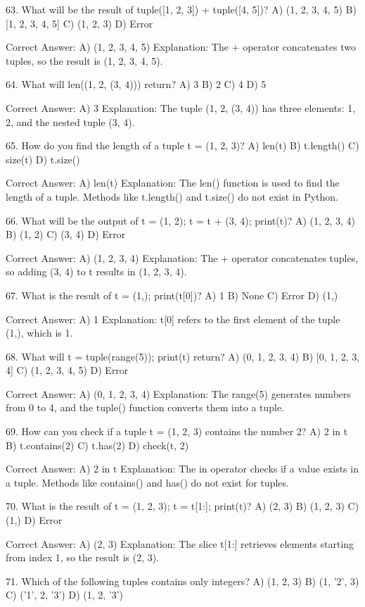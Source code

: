 63. What will be the result of tuple([1, 2, 3]) + tuple([4, 5])?
A) (1, 2, 3, 4, 5)
B) [1, 2, 3, 4, 5]
C) (1, 2, 3)
D) Error

Correct Answer: A) (1, 2, 3, 4, 5)
Explanation: The + operator concatenates two tuples, so the result is (1, 2, 3, 4, 5).

64. What will len((1, 2, (3, 4))) return?
A) 3
B) 2
C) 4
D) 5

Correct Answer: A) 3
Explanation: The tuple (1, 2, (3, 4)) has three elements: 1, 2, and the nested tuple (3, 4).

65. How do you find the length of a tuple t = (1, 2, 3)?
A) len(t)
B) t.length()
C) size(t)
D) t.size()

Correct Answer: A) len(t)
Explanation: The len() function is used to find the length of a tuple. Methods like t.length() and t.size() do not exist in Python.

66. What will be the output of t = (1, 2); t = t + (3, 4); print(t)?
A) (1, 2, 3, 4)
B) (1, 2)
C) (3, 4)
D) Error

Correct Answer: A) (1, 2, 3, 4)
Explanation: The + operator concatenates tuples, so adding (3, 4) to t results in (1, 2, 3, 4).

67. What is the result of t = (1,); print(t[0])?
A) 1
B) None
C) Error
D) (1,)

Correct Answer: A) 1
Explanation: t[0] refers to the first element of the tuple (1,), which is 1.

68. What will t = tuple(range(5)); print(t) return?
A) (0, 1, 2, 3, 4)
B) [0, 1, 2, 3, 4]
C) (1, 2, 3, 4, 5)
D) Error

Correct Answer: A) (0, 1, 2, 3, 4)
Explanation: The range(5) generates numbers from 0 to 4, and the tuple() function converts them into a tuple.

69. How can you check if a tuple t = (1, 2, 3) contains the number 2?
A) 2 in t
B) t.contains(2)
C) t.has(2)
D) check(t, 2)

Correct Answer: A) 2 in t
Explanation: The in operator checks if a value exists in a tuple. Methods like contains() and has() do not exist for tuples.

70. What is the result of t = (1, 2, 3); t = t[1:]; print(t)?
A) (2, 3)
B) (1, 2, 3)
C) (1,)
D) Error

Correct Answer: A) (2, 3)
Explanation: The slice t[1:] retrieves elements starting from index 1, so the result is (2, 3).

71. Which of the following tuples contains only integers?
A) (1, 2, 3)
B) (1, '2', 3)
C) ('1', 2, '3')
D) (1, 2, '3')

